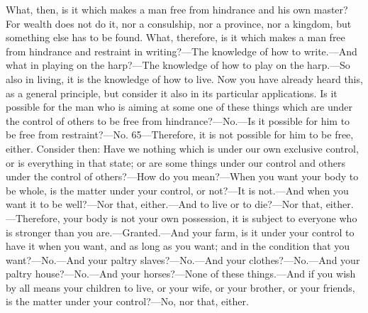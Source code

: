 What, then, is it which makes a man free from hindrance and his own master? For wealth does not do it, nor a consulship, nor a province, nor a kingdom, but something else has to be found. What, therefore, is it which makes a man free from hindrance and restraint in writing?—The knowledge of how to write.—And what in playing on the harp?—The knowledge of how to play on the harp.—So also in living, it is the knowledge of how to live. Now you have already heard this, as a general principle, but consider it also in its particular applications. Is it possible for the man who is aiming at some one of these things which are under the control of others to be free from hindrance?—No.—Is it possible for him to be free from restraint?—No. 65—Therefore, it is not possible for him to be free, either. Consider then: Have we nothing which is under our own exclusive control, or is everything in that state; or are some things under our control and others under the control of others?—How do you mean?—When you want your body to be whole, is the matter under your control, or not?—It is not.—And when you want it to be well?—Nor that, either.—And to live or to die?—Nor that, either.—Therefore, your body is not your own possession, it is subject to everyone who is stronger than you are.—Granted.—And your farm, is it under your control to have it when you want, and as long as you want; and in the condition that you want?—No.—And your paltry slaves?—No.—And your clothes?—No.—And your paltry house?—No.—And your horses?—None of these things.—And if you wish by all means your children to live, or your wife, or your brother, or your friends, is the matter under your control?—No, nor that, either.

